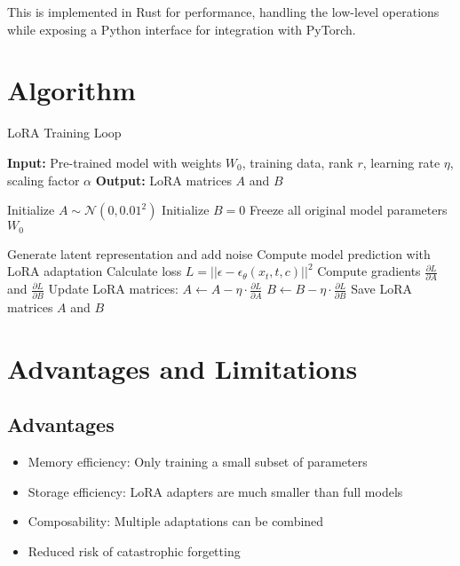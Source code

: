 \documentclass{article}
\begin{document}
This is implemented in Rust for performance, handling the low-level operations while exposing a Python interface for integration with PyTorch.

\section{Algorithm}

\begin{algorithm}
\caption{LoRA Training Loop}
\begin{algorithmic}[1]
\State \textbf{Input:} Pre-trained model with weights $W_0$, training data, rank $r$, learning rate $\eta$, scaling factor $\alpha$
\State \textbf{Output:} LoRA matrices $A$ and $B$

\State Initialize $A \sim \mathcal{N}(0, 0.01^2)$
\State Initialize $B = 0$
\State Freeze all original model parameters $W_0$

        \State Generate latent representation and add noise
        \State Compute model prediction with LoRA adaptation
        \State Calculate loss $L = ||\epsilon - \epsilon_\theta(x_t, t, c)||^2$
        \State Compute gradients $\frac{\partial L}{\partial A}$ and $\frac{\partial L}{\partial B}$
        \State Update LoRA matrices:
        \State $A \leftarrow A - \eta \cdot \frac{\partial L}{\partial A}$
        \State $B \leftarrow B - \eta \cdot \frac{\partial L}{\partial B}$
    \EndFor
\EndFor
\State Save LoRA matrices $A$ and $B$
\end{algorithmic}
\end{algorithm}

\section{Advantages and Limitations}

\subsection{Advantages}
\begin{itemize}
    \item Memory efficiency: Only training a small subset of parameters
    \item Storage efficiency: LoRA adapters are much smaller than full models
    \item Composability: Multiple adaptations can be combined
    \item Reduced risk of catastrophic forgetting
\end{itemize}
\end{document}
